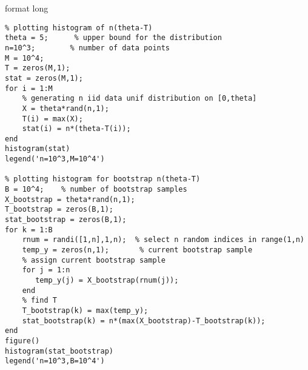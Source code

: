 format long
\lstset{basicstyle=\footnotesize,style=myCustomMatlabStyle}
\begin{lstlisting}
% plotting histogram of n(theta-T)
theta = 5;      % upper bound for the distribution
n=10^3;        % number of data points
M = 10^4;
T = zeros(M,1);
stat = zeros(M,1);
for i = 1:M
    % generating n iid data unif distribution on [0,theta]
    X = theta*rand(n,1);
    T(i) = max(X);
    stat(i) = n*(theta-T(i));
end
histogram(stat)
legend('n=10^3,M=10^4')

% plotting histogram for bootstrap n(theta-T)
B = 10^4;    % number of bootstrap samples
X_bootstrap = theta*rand(n,1);
T_bootstrap = zeros(B,1);
stat_bootstrap = zeros(B,1);
for k = 1:B
    rnum = randi([1,n],1,n);  % select n random indices in range(1,n)
    temp_y = zeros(n,1);       % current bootstrap sample
    % assign current bootstrap sample
    for j = 1:n
       temp_y(j) = X_bootstrap(rnum(j)); 
    end
    % find T
    T_bootstrap(k) = max(temp_y);
    stat_bootstrap(k) = n*(max(X_bootstrap)-T_bootstrap(k));
end
figure()
histogram(stat_bootstrap)
legend('n=10^3,B=10^4')

\end{lstlisting}